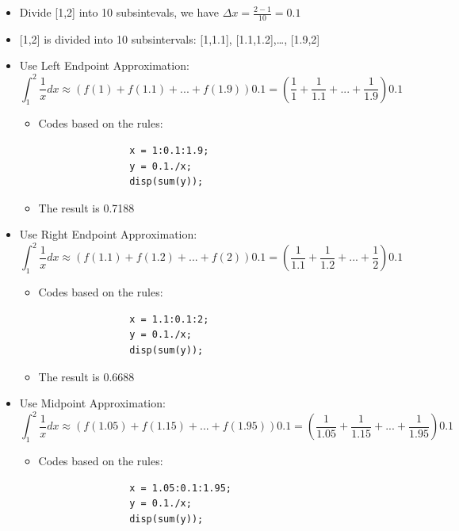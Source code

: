\documentclass[12pt,en,a4paper]{article}
\begin{document}
	\begin{itemize}
		\item Divide [1,2] into 10 subsintevals, we have \(\Delta x=\frac{2-1}{10}=0.1\)
		\item {[1,2]} is divided into 10 subsintervals: [1,1.1], [1.1,1.2],…, [1.9,2]
		\item Use Left Endpoint Approximation:
		\[\int_{1}^{2}\frac{1}{x}dx\approx (f(1)+f(1.1)+...+f(1.9))0.1=(\frac{1}{1}+\frac{1}{1.1}+...+\frac{1}{1.9})0.1\]
		\begin{itemize}
			\item Codes based on the rules:\\
			\begin{mdframed}[hidealllines=true,backgroundcolor=magenta!10]
				\begin{lstlisting}
				x = 1:0.1:1.9;
				y = 0.1./x;
				disp(sum(y));
				\end{lstlisting}
			\end{mdframed}
			\item The result is 0.7188
		\end{itemize}
		\item Use Right Endpoint Approximation:
		\[\int_{1}^{2}\frac{1}{x}dx\approx (f(1.1)+f(1.2)+...+f(2))0.1=(\frac{1}{1.1}+\frac{1}{1.2}+...+\frac{1}{2})0.1\]
		\begin{itemize}
			\item Codes based on the rules:\\
			\begin{mdframed}[hidealllines=true,backgroundcolor=magenta!10]
				\begin{lstlisting}
				x = 1.1:0.1:2;
				y = 0.1./x;
				disp(sum(y));
				\end{lstlisting}
			\end{mdframed}
			\item The result is 0.6688
		\end{itemize}
		\item Use Midpoint Approximation:
		\[\int_{1}^{2}\frac{1}{x}dx\approx (f(1.05)+f(1.15)+...+f(1.95))0.1=(\frac{1}{1.05}+\frac{1}{1.15}+...+\frac{1}{1.95})0.1\]
		\begin{itemize}
			\item Codes based on the rules:\\
			\begin{mdframed}[hidealllines=true,backgroundcolor=magenta!10]
				\begin{lstlisting}
				x = 1.05:0.1:1.95;
				y = 0.1./x;
				disp(sum(y));
				\end{lstlisting}

\end{mdframed}
\end{itemize}
\end{itemize}
\end{document}
